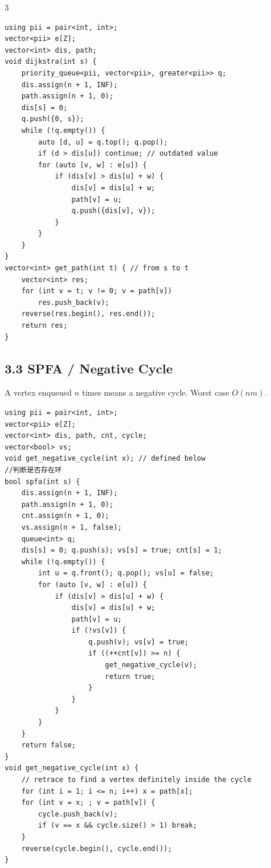 \documentclass[8pt]{extarticle}
\begin{document}
\begin{multicols*}{3}
\begin{lstlisting}
using pii = pair<int, int>;
vector<pii> e[Z];
vector<int> dis, path;
void dijkstra(int s) {
    priority_queue<pii, vector<pii>, greater<pii>> q;
    dis.assign(n + 1, INF);
    path.assign(n + 1, 0);
    dis[s] = 0;
    q.push({0, s});
    while (!q.empty()) {
        auto [d, u] = q.top(); q.pop();
        if (d > dis[u]) continue; // outdated value
        for (auto [v, w] : e[u]) {
            if (dis[v] > dis[u] + w) {
                dis[v] = dis[u] + w;
                path[v] = u;
                q.push({dis[v], v});
            }
        }
    }
}
vector<int> get_path(int t) { // from s to t
    vector<int> res;
    for (int v = t; v != 0; v = path[v])
        res.push_back(v);
    reverse(res.begin(), res.end());
    return res;
}
\end{lstlisting}

\subsection*{3.3 SPFA / Negative Cycle}

A vertex enqueued $n$ times means a negative cycle. Worst case $O(nm)$.


\begin{lstlisting}
using pii = pair<int, int>;
vector<pii> e[Z];
vector<int> dis, path, cnt, cycle;
vector<bool> vs;
void get_negative_cycle(int x); // defined below
//判断是否存在环
bool spfa(int s) {
    dis.assign(n + 1, INF);
    path.assign(n + 1, 0);
    cnt.assign(n + 1, 0);
    vs.assign(n + 1, false);
    queue<int> q;
    dis[s] = 0; q.push(s); vs[s] = true; cnt[s] = 1;
    while (!q.empty()) {
        int u = q.front(); q.pop(); vs[u] = false;
        for (auto [v, w] : e[u]) {
            if (dis[v] > dis[u] + w) {
                dis[v] = dis[u] + w;
                path[v] = u;
                if (!vs[v]) {
                    q.push(v); vs[v] = true;
                    if ((++cnt[v]) >= n) {
                        get_negative_cycle(v);
                        return true;
                    }
                }
            }
        }
    }
    return false;
}
void get_negative_cycle(int x) {
    // retrace to find a vertex definitely inside the cycle
    for (int i = 1; i <= n; i++) x = path[x];
    for (int v = x; ; v = path[v]) {
        cycle.push_back(v);
        if (v == x && cycle.size() > 1) break;
    }
    reverse(cycle.begin(), cycle.end());
}
\end{lstlisting}


\end{multicols*}
\end{document}
